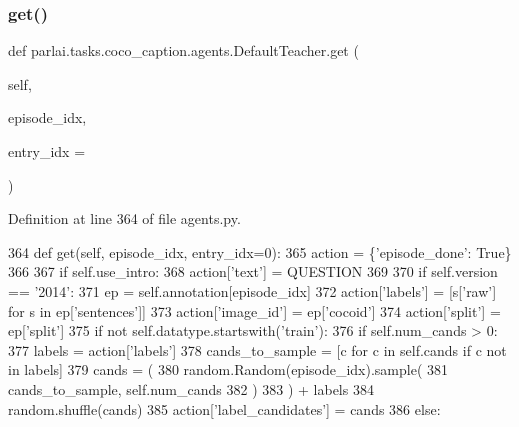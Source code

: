\subsubsection{\texorpdfstring{get()}{get()}}
{\footnotesize\ttfamily def parlai.\+tasks.\+coco\+\_\+caption.\+agents.\+Default\+Teacher.\+get (\begin{DoxyParamCaption}\item[{}]{self,  }\item[{}]{episode\+\_\+idx,  }\item[{}]{entry\+\_\+idx = {} }\end{DoxyParamCaption})}



Definition at line 364 of file agents.\+py.


\begin{DoxyCode}
364     \textcolor{keyword}{def }get(self, episode\_idx, entry\_idx=0):
365         action = \{\textcolor{stringliteral}{'episode\_done'}: \textcolor{keyword}{True}\}
366 
367         \textcolor{keywordflow}{if} self.use\_intro:
368             action[\textcolor{stringliteral}{'text'}] = QUESTION
369 
370         \textcolor{keywordflow}{if} self.version == \textcolor{stringliteral}{'2014'}:
371             ep = self.annotation[episode\_idx]
372             action[\textcolor{stringliteral}{'labels'}] = [s[\textcolor{stringliteral}{'raw'}] \textcolor{keywordflow}{for} s \textcolor{keywordflow}{in} ep[\textcolor{stringliteral}{'sentences'}]]
373             action[\textcolor{stringliteral}{'image\_id'}] = ep[\textcolor{stringliteral}{'cocoid'}]
374             action[\textcolor{stringliteral}{'split'}] = ep[\textcolor{stringliteral}{'split'}]
375             \textcolor{keywordflow}{if} \textcolor{keywordflow}{not} self.datatype.startswith(\textcolor{stringliteral}{'train'}):
376                 \textcolor{keywordflow}{if} self.num\_cands > 0:
377                     labels = action[\textcolor{stringliteral}{'labels'}]
378                     cands\_to\_sample = [c \textcolor{keywordflow}{for} c \textcolor{keywordflow}{in} self.cands \textcolor{keywordflow}{if} c \textcolor{keywordflow}{not} \textcolor{keywordflow}{in} labels]
379                     cands = (
380                         random.Random(episode\_idx).sample(
381                             cands\_to\_sample, self.num\_cands
382                         )
383                     ) + labels
384                     random.shuffle(cands)
385                     action[\textcolor{stringliteral}{'label\_candidates'}] = cands
386                 \textcolor{keywordflow}{else}:

\end{DoxyCode}
